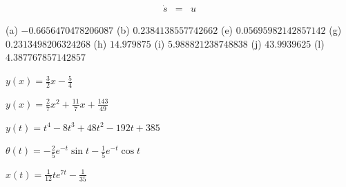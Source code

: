 \begin{description}
\begin{eqnarray*}
\dot{s} & = & u
\end{eqnarray*}
\item [{\ref{exc:ode-taylor-21}:}] (a) $-0.6656470478206087$ (b) $0.2384138557742662$
(e) $0.05695982142857142$ (g) $0.2313498206324268$ (h) $14.979875$
(i) $5.988821238748838$ (j) $43.9939625$ (l) $4.387767857142857$
\item [{\ref{exc:ode-taylor-15}:}] $y(x)=\frac{3}{2}x-\frac{5}{4}$
\item [{\ref{exc:ode-taylor-16}:}] $y(x)=\frac{2}{7}x^{2}+\frac{11}{7}x+\frac{143}{49}$
\item [{\ref{exc:ode-taylor-17}:}] $y(t)=t^{4}-8t^{3}+48t^{2}-192t+385$
\item [{\ref{exc:ode-taylor-20}:}] $\theta(t)=-\frac{2}{5}e^{-t}\sin t-\frac{1}{5}e^{-t}\cos t$
\item [{\ref{exc:ode-taylor-19}:}] $x(t)=\frac{1}{12}te^{7t}-\frac{1}{35}$
\end{description}

